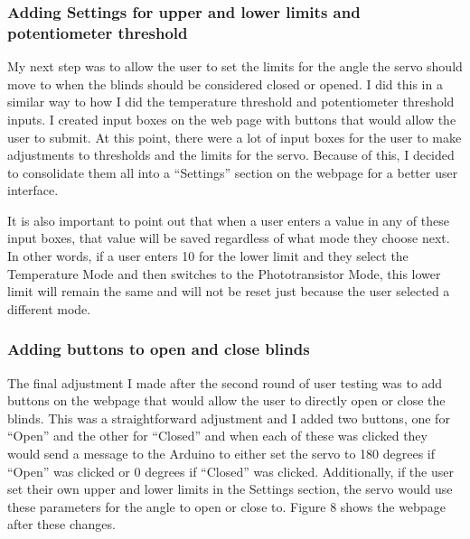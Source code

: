 \documentclass[10pt,twocolumn]{article}
\begin{document}
\subsubsection{Adding Settings for upper and lower limits and potentiometer threshold}
My next step was to allow the user to set the limits for the angle the servo should move to when the blinds should be considered closed or opened. I did this in a similar way to how I did the temperature threshold and potentiometer threshold inputs. I created input boxes on the web page with buttons that would allow the user to submit. At this point, there were a lot of input boxes for the user to make adjustments to thresholds and the limits for the servo. Because of this, I decided to consolidate them all into a “Settings” section on the webpage for a better user interface.

It is also important to point out that when a user enters a value in any of these input boxes, that value will be saved regardless of what mode they choose next. In other words, if a user enters 10 for the lower limit and they select the Temperature Mode and then switches to the Phototransistor Mode, this lower limit will remain the same and will not be reset just because the user selected a different mode.

\subsubsection{Adding buttons to open and close blinds}
The final adjustment I made after the second round of user testing was to add buttons on the webpage that would allow the user to directly open or close the blinds. This was a straightforward adjustment and I added two buttons, one for “Open” and the other for “Closed” and when each of these was clicked they would send a message to the Arduino to either set the servo to 180 degrees if “Open” was clicked or 0 degrees if “Closed” was clicked. Additionally, if the user set their own upper and lower limits in the Settings section, the servo would use these parameters for the angle to open or close to. Figure 8 shows the webpage after these changes.
\end{document}
